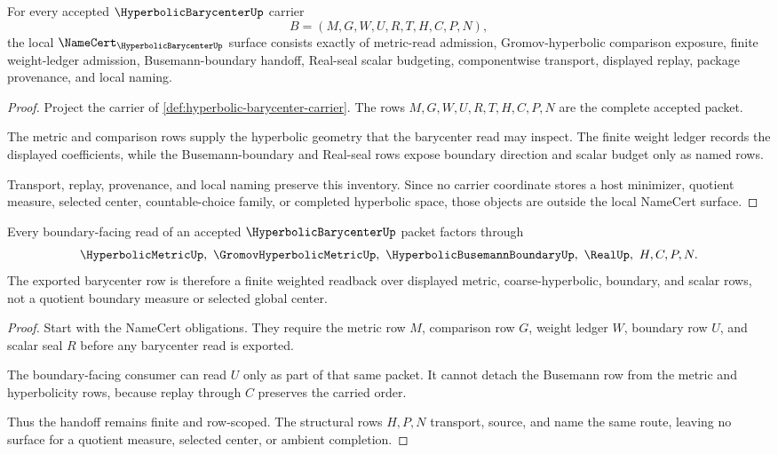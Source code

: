 \begin{theorem}
\label{thm:hyperbolic-barycenter-namecert-obligations}
For every accepted $\HyperbolicBarycenterUp$ carrier
$$
B=(M,G,W,U,R,T,H,C,P,N),
$$
the local $\NameCert_{\HyperbolicBarycenterUp}$ surface consists exactly of metric-read admission, Gromov-hyperbolic comparison exposure, finite weight-ledger admission, Busemann-boundary handoff, Real-seal scalar budgeting, componentwise transport, displayed replay, package provenance, and local naming.
\end{theorem}
\begin{proof}
Project the carrier of \autoref{def:hyperbolic-barycenter-carrier}. The rows $M,G,W,U,R,T,H,C,P,N$ are the complete accepted packet.

The metric and comparison rows supply the hyperbolic geometry that the barycenter read may inspect. The finite weight ledger records the displayed coefficients, while the Busemann-boundary and Real-seal rows expose boundary direction and scalar budget only as named rows.

Transport, replay, provenance, and local naming preserve this inventory. Since no carrier coordinate stores a host minimizer, quotient measure, selected center, countable-choice family, or completed hyperbolic space, those objects are outside the local NameCert surface.
\end{proof}

\begin{theorem}
\label{thm:hyperbolic-barycenter-boundary-handoff}
Every boundary-facing read of an accepted $\HyperbolicBarycenterUp$ packet factors through
$$
\HyperbolicMetricUp,\ \GromovHyperbolicMetricUp,\ \HyperbolicBusemannBoundaryUp,\ \RealUp,\ H,C,P,N .
$$
The exported barycenter row is therefore a finite weighted readback over displayed metric, coarse-hyperbolic, boundary, and scalar rows, not a quotient boundary measure or selected global center.
\end{theorem}
\begin{proof}
Start with the NameCert obligations. They require the metric row $M$, comparison row $G$, weight ledger $W$, boundary row $U$, and scalar seal $R$ before any barycenter read is exported.

The boundary-facing consumer can read $U$ only as part of that same packet. It cannot detach the Busemann row from the metric and hyperbolicity rows, because replay through $C$ preserves the carried order.

Thus the handoff remains finite and row-scoped. The structural rows $H,P,N$ transport, source, and name the same route, leaving no surface for a quotient measure, selected center, or ambient completion.
\end{proof}

